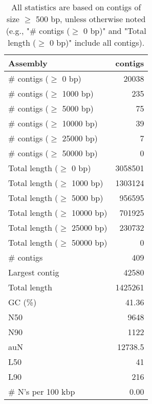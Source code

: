 \documentclass[12pt,a4paper]{article}
\begin{document}
\begin{table}[ht]
\begin{center}
\caption{All statistics are based on contigs of size $\geq$ 500 bp, unless otherwise noted (e.g., "\# contigs ($\geq$ 0 bp)" and "Total length ($\geq$ 0 bp)" include all contigs).}
\begin{tabular}{|l*{1}{|r}|}
\hline
Assembly & contigs \\ \hline
\# contigs ($\geq$ 0 bp) & 20038 \\ \hline
\# contigs ($\geq$ 1000 bp) & 235 \\ \hline
\# contigs ($\geq$ 5000 bp) & 75 \\ \hline
\# contigs ($\geq$ 10000 bp) & 39 \\ \hline
\# contigs ($\geq$ 25000 bp) & 7 \\ \hline
\# contigs ($\geq$ 50000 bp) & 0 \\ \hline
Total length ($\geq$ 0 bp) & 3058501 \\ \hline
Total length ($\geq$ 1000 bp) & 1303124 \\ \hline
Total length ($\geq$ 5000 bp) & 956595 \\ \hline
Total length ($\geq$ 10000 bp) & 701925 \\ \hline
Total length ($\geq$ 25000 bp) & 230732 \\ \hline
Total length ($\geq$ 50000 bp) & 0 \\ \hline
\# contigs & 409 \\ \hline
Largest contig & 42580 \\ \hline
Total length & 1425261 \\ \hline
GC (\%) & 41.36 \\ \hline
N50 & 9648 \\ \hline
N90 & 1122 \\ \hline
auN & 12738.5 \\ \hline
L50 & 41 \\ \hline
L90 & 216 \\ \hline
\# N's per 100 kbp & 0.00 \\ \hline
\end{tabular}
\end{center}
\end{table}
\end{document}
